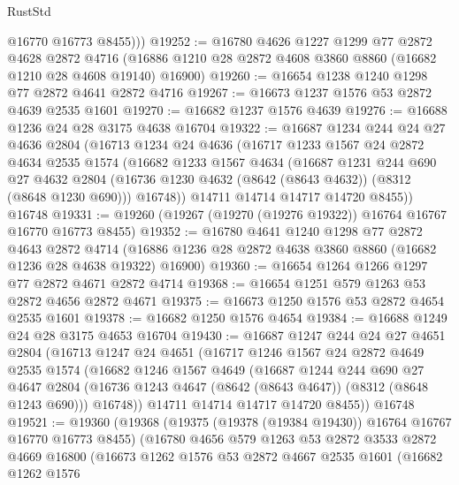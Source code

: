 \begin{lexlean}{RustStd}
\begin{coremodule}
          @16770
          @16773
          @8455)))
@19252 := @16780
    @4626
    @1227
    @1299
    @77
    @2872
    @4628
    @2872
    @4716
    (@16886 @1210 @28 @2872 @4608 @3860 @8860 (@16682 @1210 @28 @4608 @19140) @16900)
@19260 := @16654 @1238 @1240 @1298 @77 @2872 @4641 @2872 @4716
@19267 := @16673 @1237 @1576 @53 @2872 @4639 @2535 @1601
@19270 := @16682 @1237 @1576 @4639
@19276 := @16688 @1236 @24 @28 @3175 @4638 @16704
@19322 := @16687
    @1234
    @244
    @24
    @27
    @4636
    @2804
    (@16713
      @1234
      @24
      @4636
      (@16717
        @1233
        @1567
        @24
        @2872
        @4634
        @2535
        @1574
        (@16682
          @1233
          @1567
          @4634
          (@16687
            @1231
            @244
            @690
            @27
            @4632
            @2804
            (@16736 @1230 @4632 (@8642 (@8643 @4632)) (@8312 (@8648 @1230 @690)))
            @16748))
        @14711
        @14714
        @14717
        @14720
        @8455))
    @16748
@19331 := @19260 (@19267 (@19270 (@19276 @19322)) @16764 @16767 @16770 @16773 @8455)
@19352 := @16780
    @4641
    @1240
    @1298
    @77
    @2872
    @4643
    @2872
    @4714
    (@16886 @1236 @28 @2872 @4638 @3860 @8860 (@16682 @1236 @28 @4638 @19322) @16900)
@19360 := @16654 @1264 @1266 @1297 @77 @2872 @4671 @2872 @4714
@19368 := @16654 @1251 @579 @1263 @53 @2872 @4656 @2872 @4671
@19375 := @16673 @1250 @1576 @53 @2872 @4654 @2535 @1601
@19378 := @16682 @1250 @1576 @4654
@19384 := @16688 @1249 @24 @28 @3175 @4653 @16704
@19430 := @16687
    @1247
    @244
    @24
    @27
    @4651
    @2804
    (@16713
      @1247
      @24
      @4651
      (@16717
        @1246
        @1567
        @24
        @2872
        @4649
        @2535
        @1574
        (@16682
          @1246
          @1567
          @4649
          (@16687
            @1244
            @244
            @690
            @27
            @4647
            @2804
            (@16736 @1243 @4647 (@8642 (@8643 @4647)) (@8312 (@8648 @1243 @690)))
            @16748))
        @14711
        @14714
        @14717
        @14720
        @8455))
    @16748
@19521 := @19360
    (@19368
      (@19375 (@19378 (@19384 @19430)) @16764 @16767 @16770 @16773 @8455)
      (@16780
        @4656
        @579
        @1263
        @53
        @2872
        @3533
        @2872
        @4669
        @16800
        (@16673
          @1262
          @1576
          @53
          @2872
          @4667
          @2535
          @1601
          (@16682
            @1262
            @1576

\end{coremodule}
\end{lexlean}
